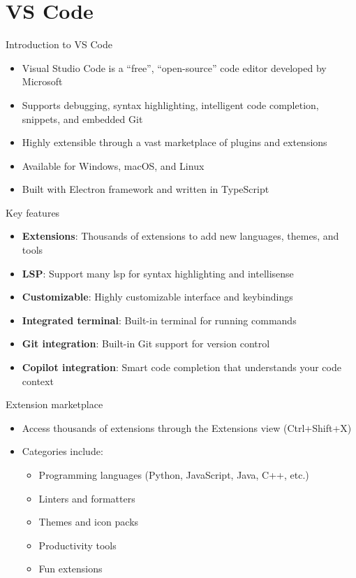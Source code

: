 \section{VS Code}

\begin{frame}[fragile]{Introduction to VS Code}
	\begin{itemize}
		\item Visual Studio Code is a ``free'', ``open-source'' code editor developed by Microsoft
		\item Supports debugging, syntax highlighting, intelligent code completion, snippets, and embedded Git
		\item Highly extensible through a vast marketplace of plugins and extensions
		\item Available for Windows, macOS, and Linux
		\item Built with Electron framework and written in TypeScript
	\end{itemize}
\end{frame}

\begin{frame}[fragile]{Key features}
	\begin{itemize}
		\item \textbf{Extensions}: Thousands of extensions to add new languages, themes, and tools
		\item \textbf{LSP}: Support many lsp for syntax highlighting and intellisense
		\item \textbf{Customizable}: Highly customizable interface and keybindings
		\item \textbf{Integrated terminal}: Built-in terminal for running commands
		\item \textbf{Git integration}: Built-in Git support for version control
		\item \textbf{Copilot integration}: Smart code completion that understands your code context
	\end{itemize}
\end{frame}

\begin{frame}[fragile]{Extension marketplace}
	\begin{itemize}
		\item Access thousands of extensions through the Extensions view (Ctrl+Shift+X)
		\item Categories include:
		\begin{itemize}
			\item Programming languages (Python, JavaScript, Java, C++, etc.)
			\item Linters and formatters
			\item Themes and icon packs
			\item Productivity tools
			\item Fun extensions
		\end{itemize}
	\end{itemize}
\end{frame}

